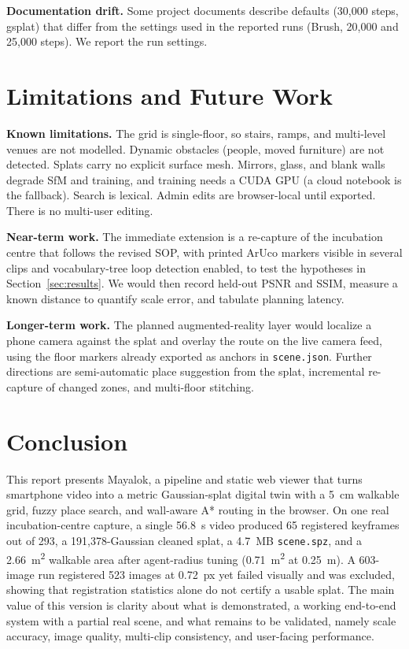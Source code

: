 \documentclass[conference]{IEEEtran}
\begin{document}
\textbf{Documentation drift.} Some project documents describe defaults (30,000 steps, gsplat) that differ from the settings used in the reported runs (Brush, 20,000 and 25,000 steps). We report the run settings.

\section{Limitations and Future Work}
\textbf{Known limitations.} The grid is single-floor, so stairs, ramps, and multi-level venues are not modelled. Dynamic obstacles (people, moved furniture) are not detected. Splats carry no explicit surface mesh. Mirrors, glass, and blank walls degrade SfM and training, and training needs a CUDA GPU (a cloud notebook is the fallback). Search is lexical. Admin edits are browser-local until exported. There is no multi-user editing.

\textbf{Near-term work.} The immediate extension is a re-capture of the incubation centre that follows the revised SOP, with printed ArUco markers visible in several clips and vocabulary-tree loop detection enabled, to test the hypotheses in Section~\ref{sec:results}. We would then record held-out PSNR and SSIM, measure a known distance to quantify scale error, and tabulate planning latency.

\textbf{Longer-term work.} The planned augmented-reality layer would localize a phone camera against the splat and overlay the route on the live camera feed, using the floor markers already exported as anchors in \texttt{scene.json}. Further directions are semi-automatic place suggestion from the splat, incremental re-capture of changed zones, and multi-floor stitching.

\section{Conclusion}
This report presents Mayalok, a pipeline and static web viewer that turns smartphone video into a metric Gaussian-splat digital twin with a 5~cm walkable grid, fuzzy place search, and wall-aware A* routing in the browser. On one real incubation-centre capture, a single 56.8~s video produced 65 registered keyframes out of 293, a 191,378-Gaussian cleaned splat, a 4.7~MB \texttt{scene.spz}, and a 2.66~m\textsuperscript{2} walkable area after agent-radius tuning (0.71~m\textsuperscript{2} at 0.25~m). A 603-image run registered 523 images at 0.72~px yet failed visually and was excluded, showing that registration statistics alone do not certify a usable splat. The main value of this version is clarity about what is demonstrated, a working end-to-end system with a partial real scene, and what remains to be validated, namely scale accuracy, image quality, multi-clip consistency, and user-facing performance.
\end{document}
